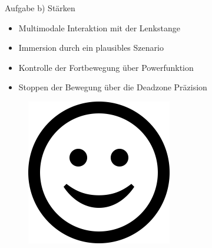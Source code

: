 \documentclass{beamer}
\begin{document}
\begin{frame}{Aufgabe b) Stärken}
\begin{minipage}[c]{0.72\textwidth}
\begin{itemize}
\item Multimodale Interaktion mit der Lenkstange
\item Immersion durch ein plausibles Szenario
\item Kontrolle der Fortbewegung über Powerfunktion
\item Stoppen der Bewegung über die Deadzone
Präzision
\end{itemize}
\end{minipage}
\hfill
\begin{minipage}[c]{0.25\textwidth}
\begin{figure}
\centering
\includegraphics[width=\textwidth, keepaspectratio]{img/smile}
\caption{\cite{smiley}}
\end{figure}
\end{minipage}
\end{frame}
\end{document}
